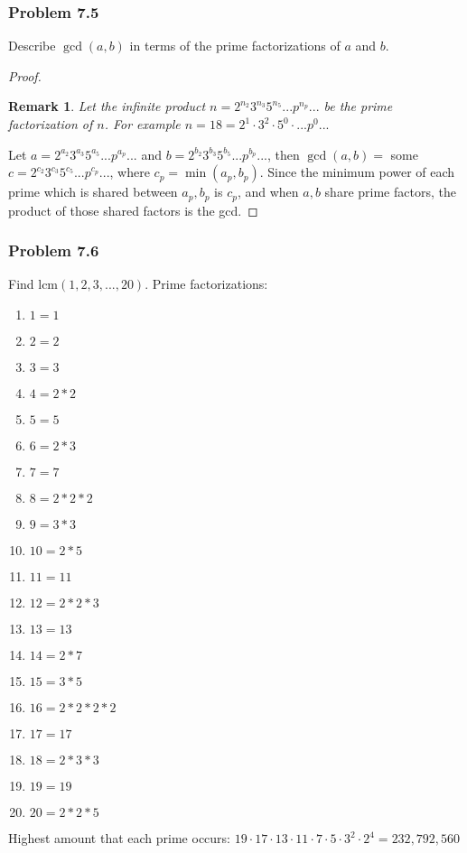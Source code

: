 \documentclass[hidelinks,12pt]{article}
\newtheorem*{remark}{Remark}
\begin{document}
\subsubsection{Problem 7.5}
Describe $\gcd(a,b)$ in terms of the prime factorizations of $a$ and $b$.
\begin{proof}
\begin{remark}Let the infinite product $n=2^{n_2}3^{n_3}5^{n_5}...p^{n_p}...$ be the prime factorization of $n$. For example $n=18=2^1\cdot3^2\cdot5^0\cdot...p^0...$ \end{remark}
Let $a=2^{a_2}3^{a_3}5^{a_5}...p^{a_p}...$ and $b=2^{b_2}3^{b_3}5^{b_5}...p^{b_p}...$, then $\gcd(a,b)=$ some $c=2^{c_2}3^{c_3}5^{c_5}...p^{c_p}...$, where $c_p=\min(a_p,b_p)$. Since the minimum power of each prime which is shared between $a_p,b_p$ is $c_p$, and when $a,b$ share prime factors, the product of those shared factors is the gcd.
\end{proof}
\subsubsection{Problem 7.6}
Find lcm$(1,2,3,...,20)$.
Prime factorizations:
\begin{enumerate}
    \item $1=1$
    \item $2=2$
    \item $3=3$
    \item $4=2*2$
    \item $5=5$
    \item $6=2*3$
    \item $7=7$
    \item $8=2*2*2$
    \item $9=3*3$
    \item $10=2*5$
    \item $11=11$
    \item $12=2*2*3$
    \item $13=13$
    \item $14=2*7$
    \item $15=3*5$
    \item $16=2*2*2*2$
    \item $17=17$
    \item $18=2*3*3$
    \item $19=19$
    \item $20=2*2*5$
\end{enumerate}
Highest amount that each prime occurs: $19\cdot17\cdot13\cdot11\cdot7\cdot5\cdot3^2\cdot2^4=232,792,560$
\newpage
\end{document}
